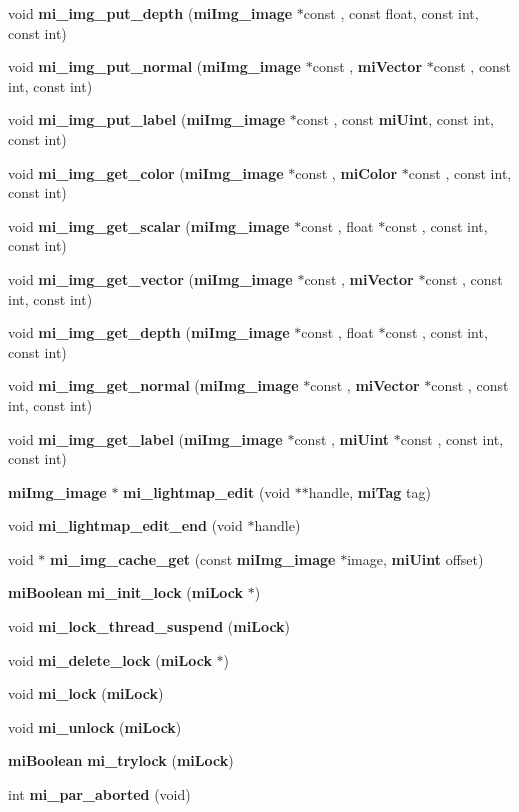 \begin{CompactItemize}
\item 
void {\bf mi\_\-img\_\-put\_\-depth} ({\bf mi\-Img\_\-image} $\ast$const , const float, const int, const int)
\item 
void {\bf mi\_\-img\_\-put\_\-normal} ({\bf mi\-Img\_\-image} $\ast$const , {\bf mi\-Vector} $\ast$const , const int, const int)
\item 
void {\bf mi\_\-img\_\-put\_\-label} ({\bf mi\-Img\_\-image} $\ast$const , const {\bf mi\-Uint}, const int, const int)
\item 
void {\bf mi\_\-img\_\-get\_\-color} ({\bf mi\-Img\_\-image} $\ast$const , {\bf mi\-Color} $\ast$const , const int, const int)
\item 
void {\bf mi\_\-img\_\-get\_\-scalar} ({\bf mi\-Img\_\-image} $\ast$const , float $\ast$const , const int, const int)
\item 
void {\bf mi\_\-img\_\-get\_\-vector} ({\bf mi\-Img\_\-image} $\ast$const , {\bf mi\-Vector} $\ast$const , const int, const int)
\item 
void {\bf mi\_\-img\_\-get\_\-depth} ({\bf mi\-Img\_\-image} $\ast$const , float $\ast$const , const int, const int)
\item 
void {\bf mi\_\-img\_\-get\_\-normal} ({\bf mi\-Img\_\-image} $\ast$const , {\bf mi\-Vector} $\ast$const , const int, const int)
\item 
void {\bf mi\_\-img\_\-get\_\-label} ({\bf mi\-Img\_\-image} $\ast$const , {\bf mi\-Uint} $\ast$const , const int, const int)
\item 
{\bf mi\-Img\_\-image} $\ast$ {\bf mi\_\-lightmap\_\-edit} (void $\ast$$\ast$handle, {\bf mi\-Tag} tag)
\item 
void {\bf mi\_\-lightmap\_\-edit\_\-end} (void $\ast$handle)
\item 
void $\ast$ {\bf mi\_\-img\_\-cache\_\-get} (const {\bf mi\-Img\_\-image} $\ast$image, {\bf mi\-Uint} offset)
\item 
{\bf mi\-Boolean} {\bf mi\_\-init\_\-lock} ({\bf mi\-Lock} $\ast$)
\item 
void {\bf mi\_\-lock\_\-thread\_\-suspend} ({\bf mi\-Lock})
\item 
void {\bf mi\_\-delete\_\-lock} ({\bf mi\-Lock} $\ast$)
\item 
void {\bf mi\_\-lock} ({\bf mi\-Lock})
\item 
void {\bf mi\_\-unlock} ({\bf mi\-Lock})
\item 
{\bf mi\-Boolean} {\bf mi\_\-trylock} ({\bf mi\-Lock})
\item 
int {\bf mi\_\-par\_\-aborted} (void)
$$
\end{CompactItemize}
